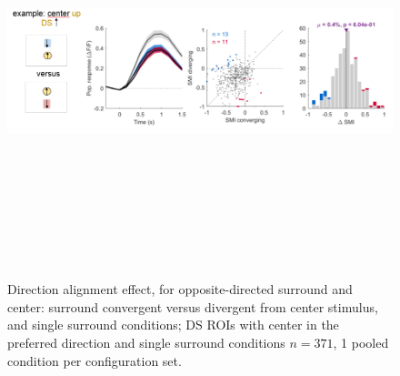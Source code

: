\begin{figure}[H] \centering \includegraphics[width=12cm,height=12cm,keepaspectratio]{Figures/7.Results/finalPopulation/sel/diagrams/22.png} 
\caption{Direction alignment effect, for opposite-directed surround and center: surround convergent versus divergent from center stimulus, and single surround conditions; DS ROIs with center in the preferred direction and single surround conditions $n=371$, 1 pooled condition per configuration set.} 
\end{figure}

% 
%    
%           
%
%        

